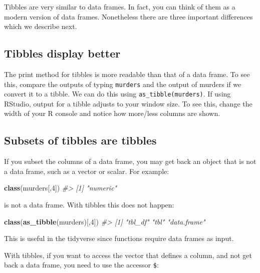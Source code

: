 \documentclass[
]{krantz}
\newenvironment{Shaded}{\begin{snugshade}}{\end{snugshade}}
\newcommand{\CommentTok}[1]{\textcolor[rgb]{0.37,0.37,0.37}{\textit{#1}}}
\newcommand{\DecValTok}[1]{\textcolor[rgb]{0.06,0.06,0.06}{#1}}
\newcommand{\KeywordTok}[1]{\textcolor[rgb]{0.27,0.27,0.27}{\textbf{#1}}}
\newcommand{\NormalTok}[1]{#1}
\begin{document}
Tibbles are very similar to data frames. In fact, you can think of them as a modern version of data frames. Nonetheless there are three important differences which we describe next.

\hypertarget{tibbles-display-better}{%
\subsection{Tibbles display better}\label{tibbles-display-better}}

The print method for tibbles is more readable than that of a data frame. To see this, compare the outputs of typing \texttt{murders} and the output of murders if we convert it to a tibble. We can do this using \texttt{as\_tibble(murders)}. If using RStudio, output for a tibble adjusts to your window size. To see this, change the width of your R console and notice how more/less columns are shown.

\hypertarget{subsets-of-tibbles-are-tibbles}{%
\subsection{Subsets of tibbles are tibbles}\label{subsets-of-tibbles-are-tibbles}}

If you subset the columns of a data frame, you may get back an object that is not a data frame, such as a vector or scalar. For example:

\begin{Shaded}
\begin{Highlighting}[]
\KeywordTok{class}\NormalTok{(murders[,}\DecValTok{4}\NormalTok{])}
\CommentTok{#> [1] "numeric"}
\end{Highlighting}
\end{Shaded}

is not a data frame. With tibbles this does not happen:

\begin{Shaded}
\begin{Highlighting}[]
\KeywordTok{class}\NormalTok{(}\KeywordTok{as_tibble}\NormalTok{(murders)[,}\DecValTok{4}\NormalTok{])}
\CommentTok{#> [1] "tbl_df"     "tbl"        "data.frame"}
\end{Highlighting}
\end{Shaded}

This is useful in the tidyverse since functions require data frames as input.

With tibbles, if you want to access the vector that defines a column, and not get back a data frame, you need to use the accessor \texttt{\$}:
\end{document}
